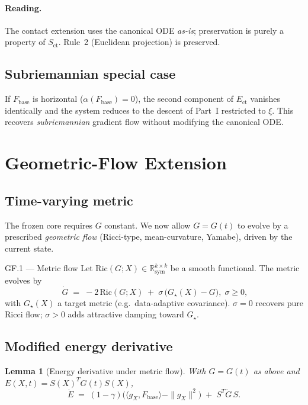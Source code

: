 \documentclass[11pt,oneside]{amsart}
\def\qquad{ }%
\theoremstyle{plain}
\newtheorem{lemma}[theorem]{Lemma}
\theoremstyle{definition}
\newcommand{\gX}{g_X}
\newcommand{\Fbase}{F_{\mathrm{base}}}
\newcommand{\R}{\mathbb{R}}
\begin{document}
\paragraph{Reading.}
The contact extension uses the canonical ODE \emph{as-is}; preservation
is purely a property of $S_{\mathrm{ct}}$. Rule~2 (Euclidean projection)
is preserved.

\subsection{Subriemannian special case}

If $\Fbase$ is horizontal ($\alpha(\Fbase)=0$), the second component of
$E_{\mathrm{ct}}$ vanishes identically and the system reduces to the
descent of Part~I restricted to $\xi$. This recovers
\emph{subriemannian} gradient flow without modifying the canonical ODE.

\section{Geometric-Flow Extension}
\label{sec:geomflow}

\subsection{Time-varying metric}

The frozen core requires $G$ constant. We now allow $G=G(t)$ to evolve
by a prescribed \emph{geometric flow} (Ricci-type, mean-curvature,
Yamabe), driven by the current state.

\begin{defbox}{GF.1 --- Metric flow}
Let $\mathrm{Ric}(G;X)\in\R^{k\times k}_{\mathrm{sym}}$ be a smooth
functional. The metric evolves by
\[
  \boxed{\;\dot G \;=\; -2\,\mathrm{Ric}(G;X)
               \;+\;\sigma\,\bigl(G_{\star}(X)-G\bigr),\;}
  \qquad \sigma\ge 0,
\]
with $G_{\star}(X)$ a target metric (e.g.\ data-adaptive covariance).
$\sigma=0$ recovers pure Ricci flow; $\sigma>0$ adds attractive
damping toward $G_{\star}$.
\end{defbox}

\subsection{Modified energy derivative}

\begin{lemma}[Energy derivative under metric flow]
\label{lem:Edot-flow}
With $G=G(t)$ as above and $E(X,t)=S(X)^{T}G(t)S(X)$,
\[
  \dot E
  \;=\; (1-\gamma)\bigl(\langle\gX,\Fbase\rangle - \|\gX\|^{2}\bigr)
        \;+\; S^{T}\dot G\, S.
\]
\end{lemma}
\end{document}
